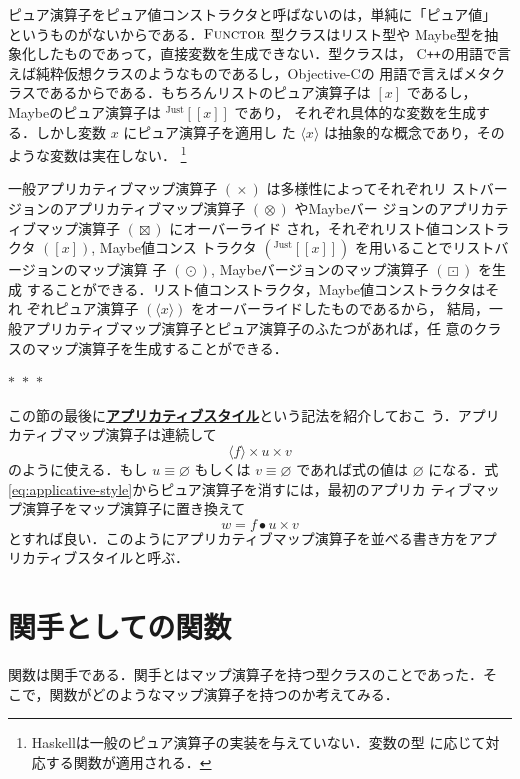 \documentclass[a5paper,twoside,fleqn]{jsbook}
\def\[{\left[\!\left[}
\def\]{\right]\!\right]}
\newcommand{\separator}{\begin{center}$*$~$*$~$*$\end{center}}
\newcommand{\programminglanguage}[1]{\textsf{#1}}
\newcommand{\cxx}{\programminglanguage{C}\texttt{++}}
\newcommand{\haskell}{\programminglanguage{Haskell}}
\newcommand{\objectivec}{\programminglanguage{Objective-C}}
\newcommand{\keyword}[1]{{\underline{\textbf{#1}}}}
\newcommand{\mPureNothing}{\varnothing}
\DeclareMathOperator{\mAppMap}{\times}
\DeclareMathOperator{\mAppMapList}{\otimes}
\DeclareMathOperator{\mAppMapMaybe}{\boxtimes}
\DeclareMathOperator{\mMap}{\bullet}
\DeclareMathOperator{\mMapList}{\odot}
\DeclareMathOperator{\mMapMaybe}{\boxdot}
\newcommand{\mGenericValueConstructor}[1]{\mathrm{#1}}
\newcommand{\mGenericWith}[2]{{}^\mGenericValueConstructor{#1}\[#2\]}
\newcommand{\mJustWith}[1]{\mGenericWith{Just}{#1}}
\newcommand{\mListWith}[1]{\left[#1\right]}
\newcommand{\mPureWith}[1]{\langle#1\rangle}
\newcommand{\mGenericTypeClass}[1]{\textsc{#1}} %
\newcommand{\mFunctorTypeClass}{\mGenericTypeClass{Functor}}
\begin{document}
ピュア演算子をピュア値コンストラクタと呼ばないのは，単純に「ピュア値」
というものがないからである．$\mFunctorTypeClass$ 型クラスはリスト型や
Maybe型を抽象化したものであって，直接変数を生成できない．型クラスは，
\cxx の用語で言えば純粋仮想クラスのようなものであるし，\objectivec の
用語で言えばメタクラスであるからである．もちろんリストのピュア演算子は
$\mListWith{x}$ であるし，Maybeのピュア演算子は $\mJustWith{x}$ であり，
それぞれ具体的な変数を生成する．しかし変数 $x$ にピュア演算子を適用し
た $\mPureWith{x}$ は抽象的な概念であり，そのような変数は実在しない．
\footnote{\haskell は一般のピュア演算子の実装を与えていない．変数の型
  に応じて対応する関数が適用される．}

一般アプリカティブマップ演算子 $(\mAppMap)$ は多様性によってそれぞれリ
ストバージョンのアプリカティブマップ演算子 $(\mAppMapList)$ やMaybeバー
ジョンのアプリカティブマップ演算子 $(\mAppMapMaybe)$ にオーバーライド
され，それぞれリスト値コンストラクタ $(\mListWith{x})$, Maybe値コンス
トラクタ $(\mJustWith{x})$ を用いることでリストバージョンのマップ演算
子 $(\mMapList)$, Maybeバージョンのマップ演算子 $(\mMapMaybe)$ を生成
することができる．リスト値コンストラクタ，Maybe値コンストラクタはそれ
ぞれピュア演算子 $(\mPureWith{x})$ をオーバーライドしたものであるから，
結局，一般アプリカティブマップ演算子とピュア演算子のふたつがあれば，任
意のクラスのマップ演算子を生成することができる．

\separator

この節の最後に\keyword{アプリカティブスタイル}という記法を紹介しておこ
う．アプリカティブマップ演算子は連続して
\begin{equation}
\label{eq:applicative-style}
\mPureWith{f}\mAppMap u\mAppMap v
\end{equation}
のように使える．もし $u\equiv\mPureNothing$ もしくは
$v\equiv\mPureNothing$ であれば式の値は $\mPureNothing$ になる．式
\eqref{eq:applicative-style}からピュア演算子を消すには，最初のアプリカ
ティブマップ演算子をマップ演算子に置き換えて
\begin{equation}
w=f\mMap u\mAppMap v
\end{equation}
とすれば良い．このようにアプリカティブマップ演算子を並べる書き方をアプ
リカティブスタイルと呼ぶ．

\section{関手としての関数}

関数は関手である．関手とはマップ演算子を持つ型クラスのことであった．そ
こで，関数がどのようなマップ演算子を持つのか考えてみる．
\end{document}

